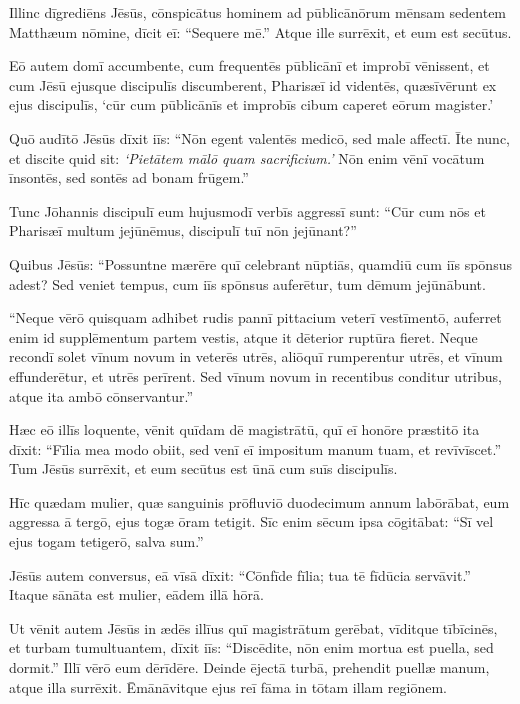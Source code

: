 \Versus Illinc dīgrediēns Jēsūs, cōnspicātus hominem ad pūblicānōrum mēnsam sedentem Matthæum nōmine, dīcit eī: ``Sequere mē.'' Atque ille surrēxit, et eum est secūtus. 

\Versus Eō autem domī accumbente, cum frequentēs pūblicānī et improbī vēnissent, et cum Jēsū ejusque discipulīs discumberent, 
\Versus Pharisæī id videntēs, quæsīvērunt ex ejus discipulīs, `cūr cum pūblicānīs et improbīs cibum caperet eōrum magister.'

\Versus Quō audītō Jēsūs dīxit iīs: ``Nōn egent valentēs medicō, sed male affectī. 
\Versus Īte nunc, et discite quid sit: \emph{`Pietātem mālō quam sacrificium.'} Nōn enim vēnī vocātum īnsontēs, sed sontēs ad bonam frūgem.''

\Versus Tunc Jōhannis discipulī eum hujusmodī verbīs aggressī sunt: ``Cūr cum nōs et Pharisæī multum jejūnēmus, discipulī tuī nōn jejūnant?'' 

\Versus Quibus Jēsūs: ``Possuntne mærēre quī celebrant nūptiās, quamdiū cum iīs spōnsus adest? Sed veniet tempus, cum iīs spōnsus auferētur, tum dēmum jejūnābunt.

\Versus ``Neque vērō quisquam adhibet rudis pannī pittacium veterī vestīmentō, auferret enim id supplēmentum partem vestis, atque it dēterior ruptūra fieret. 
\Versus Neque recondī solet vīnum novum in veterēs utrēs, aliōquī rumperentur utrēs, et vīnum effunderētur, et utrēs perīrent. Sed vīnum novum in recentibus conditur utribus, atque ita ambō cōnservantur.''

\Versus Hæc eō illīs loquente, vēnit quīdam dē magistrātū, quī eī honōre præstitō ita dīxit: ``Fīlia mea modo obiit, sed venī eī impositum manum tuam, et revīvīscet.'' 
\Versus Tum Jēsūs surrēxit, et eum secūtus est ūnā cum suīs discipulīs.

\Versus Hīc quædam mulier, quæ sanguinis prōfluviō duodecimum annum labōrābat, eum aggressa ā tergō, ejus togæ ōram tetigit. 
\Versus Sīc enim sēcum ipsa cōgitābat: ``Sī vel ejus togam tetigerō, salva sum.''

\Versus Jēsūs autem conversus, eā vīsā dīxit: ``Cōnfīde fīlia; tua tē fīdūcia servāvit.'' Itaque sānāta est mulier, eādem illā hōrā.

\Versus Ut vēnit autem Jēsūs in ædēs illīus quī magistrātum gerēbat, vīditque tībīcinēs, et turbam tumultuantem, 
\Versus dīxit iīs: ``Discēdite, nōn enim mortua est puella, sed dormit.'' Illī vērō eum dērīdēre. 
\Versus Deinde ējectā turbā, prehendit puellæ manum, atque illa surrēxit. 
\Versus Ēmānāvitque ejus reī fāma in tōtam illam regiōnem.

